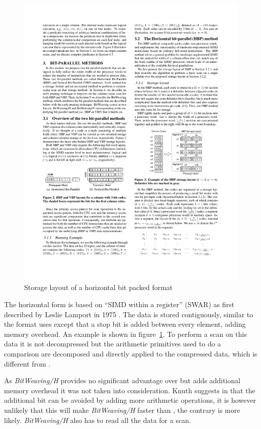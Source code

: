 \begin{figure}[h] \begin{center}
\includegraphics[scale=1.5]{images/bwh}
\end{center}
\caption{Storage layout of a horizontal bit packed format~\cite{BitWeaving}}
\label{fig:bwh}
\end{figure}

The horizontal form is based on ``SIMD within a register'' (SWAR) as first
described by Leslie Lamport in 1975 \cite{SWAR}. The data is stored
contiguously, similar to the format \simdscan{} uses except that a stop bit is
added between every element, adding memory overhead. An example is shown in
figure~\ref{fig:bwh}. To perform a scan on this data it is not decompressed but
the arithmetic primitives used to do a comparison are decomposed and directly
applied to the compressed data, which is different from \simdscan{}.

As \emph{BitWeaving/H} provides no significant advantage over \simdscan{} but
adds additional memory overhead it was not taken into consideration. Knuth
suggests in \cite{SWAR} that the additional bit can be avoided by adding more
arithmetic operations, it is however unlikely that this will make
\emph{BitWeaving/H} faster than \simdscan{}, the contrary is more likely.
\emph{BitWeaving/H} also has to read all the data for a scan.

